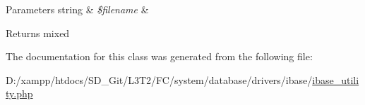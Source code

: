 \begin{DoxyParams}[1]{Parameters}
string & {\em \$filename} & \\
\hline
\end{DoxyParams}
\begin{DoxyReturn}{Returns}
mixed 
\end{DoxyReturn}


The documentation for this class was generated from the following file\+:\begin{DoxyCompactItemize}
\item 
D\+:/xampp/htdocs/\+S\+D\+\_\+\+Git/\+L3\+T2/\+F\+C/system/database/drivers/ibase/\hyperlink{ibase__utility_8php}{ibase\+\_\+utility.\+php}\end{DoxyCompactItemize}
